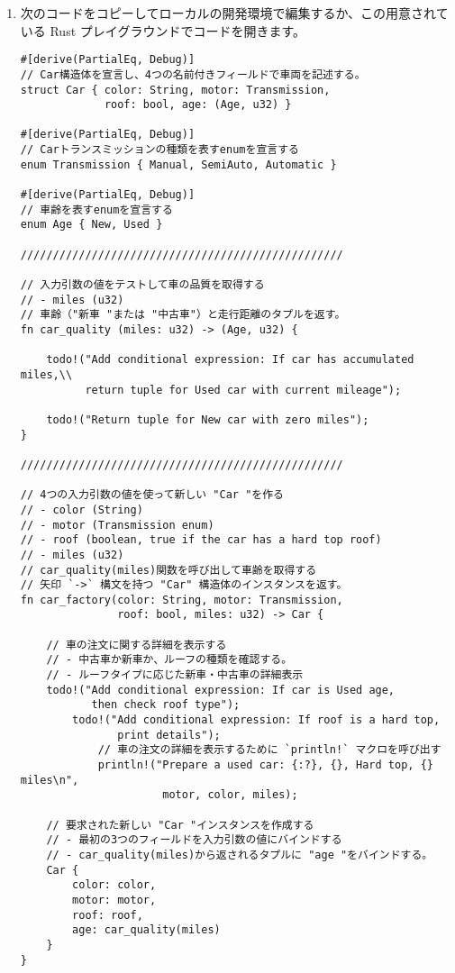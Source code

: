 \begin{enumerate}

\item 次のコードをコピーしてローカルの開発環境で編集するか、この用意されている Rust プレイグラウンドでコードを開きます。


\begin{lstlisting}[numbers=none]
#[derive(PartialEq, Debug)]
// Car構造体を宣言し、4つの名前付きフィールドで車両を記述する。
struct Car { color: String, motor: Transmission,
             roof: bool, age: (Age, u32) }

#[derive(PartialEq, Debug)]
// Carトランスミッションの種類を表すenumを宣言する
enum Transmission { Manual, SemiAuto, Automatic }

#[derive(PartialEq, Debug)]
// 車齢を表すenumを宣言する
enum Age { New, Used }

//////////////////////////////////////////////////

// 入力引数の値をテストして車の品質を取得する
// - miles (u32)
// 車齢（"新車 "または "中古車"）と走行距離のタプルを返す。
fn car_quality (miles: u32) -> (Age, u32) {

    todo!("Add conditional expression: If car has accumulated miles,\\
          return tuple for Used car with current mileage");

    todo!("Return tuple for New car with zero miles");
}

//////////////////////////////////////////////////

// 4つの入力引数の値を使って新しい "Car "を作る
// - color (String)
// - motor (Transmission enum)
// - roof (boolean, true if the car has a hard top roof)
// - miles (u32)
// car_quality(miles)関数を呼び出して車齢を取得する
// 矢印 `->` 構文を持つ "Car" 構造体のインスタンスを返す。
fn car_factory(color: String, motor: Transmission,
               roof: bool, miles: u32) -> Car {

    // 車の注文に関する詳細を表示する
    // - 中古車か新車か、ルーフの種類を確認する。
    // - ルーフタイプに応じた新車・中古車の詳細表示
    todo!("Add conditional expression: If car is Used age,
           then check roof type");
        todo!("Add conditional expression: If roof is a hard top,
               print details");
            // 車の注文の詳細を表示するために `println!` マクロを呼び出す
            println!("Prepare a used car: {:?}, {}, Hard top, {} miles\n",
                      motor, color, miles);  

    // 要求された新しい "Car "インスタンスを作成する
    // - 最初の3つのフィールドを入力引数の値にバインドする
    // - car_quality(miles)から返されるタプルに "age "をバインドする。
    Car {
        color: color,
        motor: motor,
        roof: roof,
        age: car_quality(miles)
    }
}


\end{lstlisting}
\end{enumerate}
